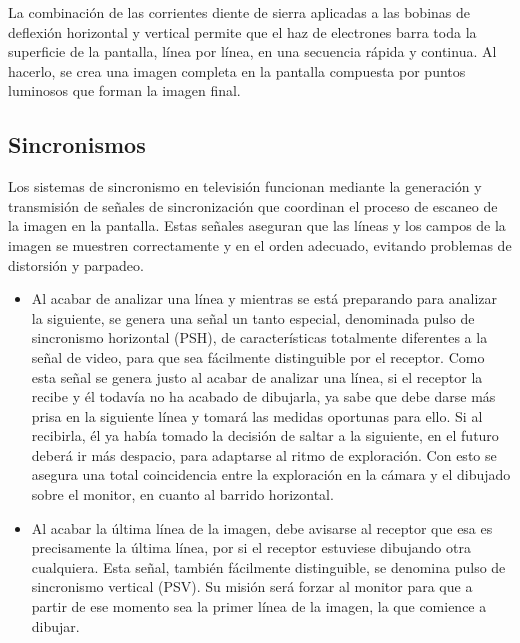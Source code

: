 \documentclass[
	12pt, %
	fleqn, %
	a4paper, %
	oneside, %
]{LegrandOrangeBook}
\begin{document}
La combinación de las corrientes diente de sierra aplicadas a las bobinas de deflexión horizontal y vertical permite que el haz de electrones barra toda la superficie de la pantalla, línea por línea, en una secuencia rápida y continua. Al hacerlo, se crea una imagen completa en la pantalla compuesta por puntos luminosos que forman la imagen final.
\subsection{Sincronismos}
Los sistemas de sincronismo en televisión funcionan mediante la generación y transmisión de señales de sincronización que coordinan el proceso de escaneo de la imagen en la pantalla. Estas señales aseguran que las líneas y los campos de la imagen se muestren correctamente y en el orden adecuado, evitando problemas de distorsión y parpadeo.
\begin{itemize}
\item Al acabar de analizar una línea y mientras se está preparando para analizar la siguiente, se genera una señal un tanto especial, denominada pulso de sincronismo horizontal (PSH), de características totalmente diferentes a la señal de video, para que sea fácilmente distinguible por el receptor. Como esta señal se genera justo al acabar de analizar una línea, si el receptor la recibe y él todavía no ha acabado de dibujarla, ya sabe que debe darse más prisa en la siguiente línea y tomará las medidas oportunas para ello.  Si al recibirla, él ya había tomado la decisión de saltar a la siguiente, en el futuro deberá ir más despacio, para adaptarse al ritmo de exploración. Con esto se asegura una total coincidencia entre la exploración en la cámara y el dibujado sobre el monitor, en cuanto al barrido horizontal.
\item Al acabar la última línea de la imagen, debe avisarse al receptor que esa es precisamente la última línea, por si el receptor estuviese dibujando otra cualquiera.
Esta señal, también fácilmente distinguible, se denomina pulso de sincronismo vertical  (PSV). Su misión será forzar al monitor para que a partir de ese momento sea la primer línea de la imagen, la que comience a dibujar.
\end{itemize}
\end{document}
